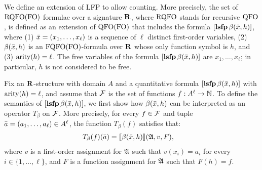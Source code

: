 We define an extension of LFP \cite{I86,vardi1982complexity} to allow counting. 
More precisely, the set of ${\rm RQFO}({\rm FO})$ formulae over a signature $\mathbf{R}$, where ${\rm RQFO}$ stands for recursive ${\rm QFO}$, is defined as an extension of ${\rm QFO}({\rm FO})$ that includes the formula $[{\bf lsfp} \, \beta(\bar{x}, h)]$, where (1) $\bar{x} = (x_1, \ldots, x_\ell)$ is a sequence of $\ell$ distinct first-order variables, (2) $\beta(\bar{x}, h)$ is an ${\rm FQFO}({\rm FO})$-formula over $\mathbf{R}$ whose only function symbol is $h$, and (3) ${\rm arity}(h) = \ell$. The free variables of the formula $[{\bf lsfp} \, \beta(\bar{x},h)]$ are $x_1, \ldots, x_\ell$; in particular, $h$ is not considered to be free.

Fix an $\mathbf{R}$-structure with domain $A$ and a quantitative formula $[{\bf lsfp} \, \beta(\bar{x},h)]$ with ${\rm arity}(h) = \ell$, and assume that $\mathcal{F}$ is the set of functions $f :A^\ell \to \mathbb{N}$. To define the semantics of $[{\bf lsfp} \, \beta(\bar{x},h)]$, we first show how $\beta(\bar{x},h)$ can be interpreted as an operator $T_{\beta}$ on $\mathcal{F}$. More precisely, for every $f \in \mathcal{F}$ and tuple $\bar{a} = (a_1, \ldots, a_{\ell}) \in A^\ell$, the function $T_{\beta}(f)$ satisfies that:
\begin{align*}
T_{\beta}(f)(\bar{a}) &= {\llbracket{}{\beta(\bar{x}, h)}\rrbracket}(\mathfrak{A},v,F),
\end{align*}
where $v$ is a first-order assignment  for $\mathfrak{A}$ such that $v(x_i) = a_i$ for every $i \in \{1, \ldots, \ell\}$, and $F$ is a function assignment for $\mathfrak{A}$ such that $F(h) = f$. 


